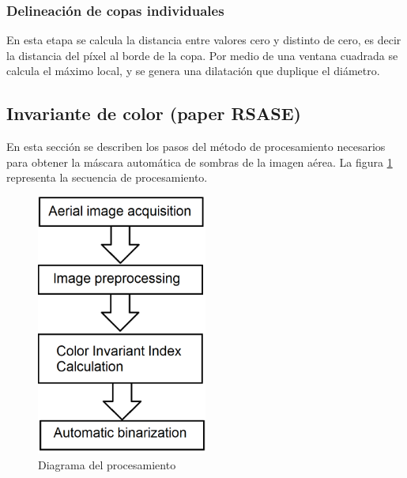 \subsubsection{Delineación de copas individuales}
En esta etapa se calcula la distancia entre valores cero y distinto de cero, es decir la distancia del píxel al borde de la copa. Por medio de una ventana cuadrada se calcula el máximo local, y se genera una dilatación que duplique el diámetro.





\subsection{Invariante de color (paper RSASE)} \label{Metodología IIC}
En esta sección se describen los pasos del método de procesamiento necesarios para obtener la máscara automática de sombras de la imagen aérea. La figura \ref{diagrama_procesamiento} representa la secuencia de procesamiento.

\begin{figure}
    \includegraphics[width=0.5\textwidth]{Imagenes/flowchart.png}
     \hfill
     \caption{Diagrama del procesamiento}
    \label{diagrama_procesamiento}
\end{figure}

